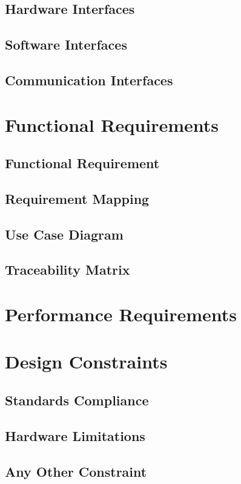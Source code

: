 \subsection{Hardware Interfaces}
\subsection{Software Interfaces}
\subsection{Communication Interfaces}


\section{Functional Requirements}
\subsection{Functional Requirement}
\subsection{Requirement Mapping}
\subsection{Use Case Diagram}
\subsection{Traceability Matrix}


\section{Performance Requirements}


\section{Design Constraints}
\subsection{Standards Compliance}
\subsection{Hardware Limitations}
\subsection{Any Other Constraint}

